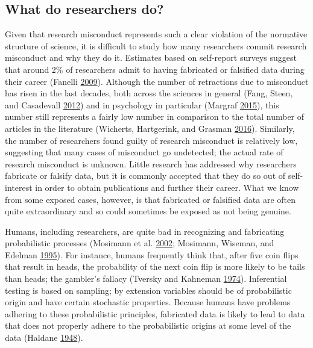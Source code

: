 \documentclass[a5paper]{book}
\begin{document}
\subsection{What do researchers do?}\label{what-do-researchers-do-2}

Given that research misconduct represents such a clear violation of the
normative structure of science, it is difficult to study how many
researchers commit research misconduct and why they do it. Estimates
based on self-report surveys suggest that around 2\% of researchers
admit to having fabricated or falsified data during their career
(Fanelli
\protect\hyperlink{ref-doi:10.1371ux2fjournal.pone.0005738}{2009}).
Although the number of retractions due to misconduct has risen in the
last decades, both across the sciences in general (Fang, Steen, and
Casadevall \protect\hyperlink{ref-doi:10.1073ux2fpnas.1212247109}{2012})
and in psychology in particular (Margraf
\protect\hyperlink{ref-doi:10.1026ux2f0033-3042ux2fa000247}{2015}), this
number still represents a fairly low number in comparison to the total
number of articles in the literature (Wicherts, Hartgerink, and Grasman
\protect\hyperlink{ref-wicherts2016}{2016}). Similarly, the number of
researchers found guilty of research misconduct is relatively low,
suggesting that many cases of misconduct go undetected; the actual rate
of research misconduct is unknown. Little research has addressed why
researchers fabricate or falsify data, but it is commonly accepted that
they do so out of self-interest in order to obtain publications and
further their career. What we know from some exposed cases, however, is
that fabricated or falsified data are often quite extraordinary and so
could sometimes be exposed as not being genuine.

Humans, including researchers, are quite bad in recognizing and
fabricating probabilistic processes (Mosimann et al.
\protect\hyperlink{ref-doi:10.1080ux2f08989620212969}{2002}; Mosimann,
Wiseman, and Edelman
\protect\hyperlink{ref-doi:10.1080ux2f08989629508573866}{1995}). For
instance, humans frequently think that, after five coin flips that
result in heads, the probability of the next coin flip is more likely to
be tails than heads; the gambler's fallacy (Tversky and Kahneman
\protect\hyperlink{ref-doi:10.1126ux2fscience.185.4157.1124}{1974}).
Inferential testing is based on sampling; by extension variables should
be of probabilistic origin and have certain stochastic properties.
Because humans have problems adhering to these probabilistic principles,
fabricated data is likely to lead to data that does not properly adhere
to the probabilistic origins at some level of the data (Haldane
\protect\hyperlink{ref-Haldane1948-nm}{1948}).
\end{document}

